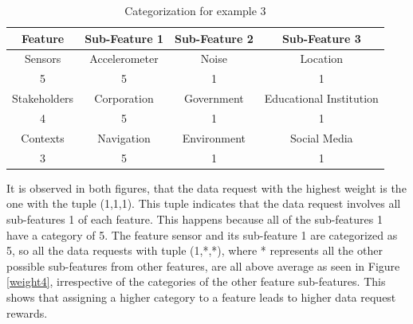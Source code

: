 \begin{table}[h!]
  \centering
  \caption{Categorization for example 3}
  \label{tab:scenario4}
  \begin{tabular}{cccc}
    \toprule
    Feature & Sub-Feature 1 & Sub-Feature 2 & Sub-Feature 3\\
    \midrule
    Sensors & Accelerometer & Noise & Location\\
     5 & 5 & 1 & 1\\ \hhline{====}
     Stakeholders & Corporation & Government & Educational Institution\\
     4 & 5 & 1 & 1\\ \hhline{====}
     Contexts & Navigation & Environment & Social Media\\
     3 & 5 & 1 & 1\\ 
    \bottomrule
  \end{tabular}
\end{table}

It is observed in both figures, that the data request with the highest weight is the one with the tuple (1,1,1). This tuple indicates that the data request involves all sub-features 1 of each feature. This happens because all of the sub-features 1 have a category of 5. The feature sensor and its sub-feature 1 are categorized as 5, so all the data requests
with tuple (1,*,*), where * represents all the other possible sub-features from other features, are all above average as seen in Figure \ref{weight4}, irrespective of the categories of the other feature sub-features. This shows that assigning a higher category to a feature leads to higher data request rewards. 



%

